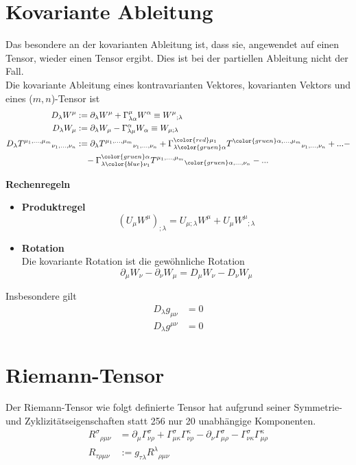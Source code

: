 \documentclass{article}
\begin{document}
\section{Kovariante Ableitung}
Das besondere an der kovarianten Ableitung ist, dass sie, angewendet auf einen Tensor, wieder einen Tensor ergibt. Dies ist bei der partiellen Ableitung nicht der Fall.\\
Die kovariante Ableitung eines kontravarianten Vektores, kovarianten Vektors und eines ($m,n$)-Tensor ist
	\begin{align}
		D_\lambda W^\mu &:= \partial_\lambda W^\mu + \Gamma^\mu_{\lambda\alpha}W^\alpha \equiv W^{\mu}{}_{;\lambda} \\
		D_\lambda W_\mu &:= \partial_\lambda W_\mu - \Gamma^\alpha_{\lambda\mu}W_\alpha \equiv W_{\mu;\lambda} \\
		D_\lambda T^{\mu_1,...,\mu_m}{}_{\nu_1,...,\nu_n} &:= \partial_\lambda T^{\mu_1,...,\mu_m}{}_{\nu_1,...,\nu_n} + \Gamma^{{\color{red}\mu_1}}_{\lambda{\color{gruen}\alpha}} T^{{\color{gruen}\alpha},...,\mu_m}{}_{\nu_1,...,\nu_n} + ... - \\
		 &\phantom{:=} - \Gamma^{{\color{gruen}\alpha}}_{\lambda{\color{blue}\nu_1}} T^{\mu_1,...,\mu_m}{}_{{\color{gruen}\alpha},...,\nu_n} - ... \notag
	\end{align}

\textbf{Rechenregeln}
	\begin{itemize}
		\item \textbf{Produktregel}
			$$(U_\mu W^\mu)_{;\lambda} = U_{\mu;\lambda}W^\mu + U_\mu W^\mu{}_{;\lambda}$$
		
		\item \textbf{Rotation}\\
		Die kovariante Rotation ist die gewöhnliche Rotation
			$$\partial_\mu W_\nu - \partial_\nu W_\mu = D_\mu W_\nu - D_\nu W_\mu$$
	\end{itemize}

Insbesondere gilt
	\begin{align*}
		D_\lambda g_{\mu\nu} &= 0 \\
		D_\lambda g^{\mu\nu} &= 0
	\end{align*}


\newpage


\section{Riemann-Tensor}
Der Riemann-Tensor wie folgt definierte Tensor hat aufgrund seiner Symmetrie- und Zyklizitätseigenschaften statt 256 nur 20 unabhängige Komponenten.
	\begin{align}
		R^\sigma{}_{\rho\mu\nu} &= \partial_\mu \Gamma^\sigma_{\nu\rho} + \Gamma^\sigma_{\mu\kappa}\Gamma^\kappa_{\nu\rho} - \partial_\nu \Gamma^\sigma_{\mu\rho} - \Gamma^\sigma_{\nu\kappa}\Gamma^\kappa_{\mu\rho} \\
		R_{\tau\rho\mu\nu} &:= g_{\tau\lambda} R^\lambda{}_{\rho\mu\nu}
	\end{align}
\end{document}
